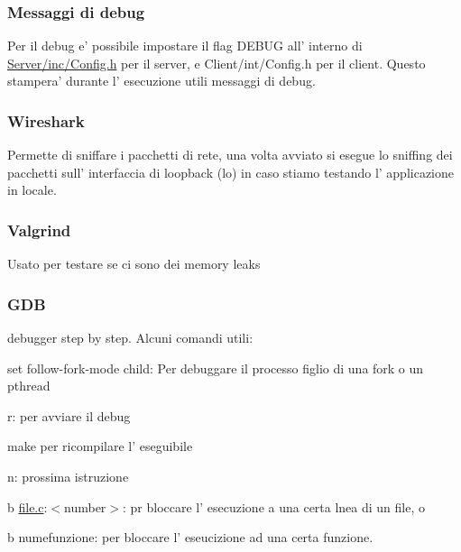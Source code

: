 \subsubsection*{Messaggi di debug}

Per il debug e' possibile impostare il flag D\+E\+B\+U\+G all' interno di \hyperlink{Server_2inc_2Config_8h}{Server/inc/\+Config.\+h} per il server, e Client/int/\+Config.\+h per il client. Questo stampera' durante l' esecuzione utili messaggi di debug.

\subsubsection*{Wireshark}

Permette di sniffare i pacchetti di rete, una volta avviato si esegue lo sniffing dei pacchetti sull' interfaccia di loopback (lo) in caso stiamo testando l' applicazione in locale.

\subsubsection*{Valgrind}

Usato per testare se ci sono dei memory leaks

\subsubsection*{G\+D\+B}

debugger step by step. Alcuni comandi utili\+:


\begin{DoxyItemize}
\item {\ttfamily set follow-\/fork-\/mode child}\+: Per debuggare il processo figlio di una fork o un pthread
\item {\ttfamily r}\+: per avviare il debug
\item {\ttfamily make} per ricompilare l' eseguibile
\item {\ttfamily n}\+: prossima istruzione
\item {\ttfamily b \hyperlink{file_8c}{file.\+c}\+:$<$number$>$}\+: pr bloccare l' esecuzione a una certa lnea di un file, o
\item {\ttfamily b numefunzione}\+: per bloccare l' eseucizione ad una certa funzione. 
\end{DoxyItemize}